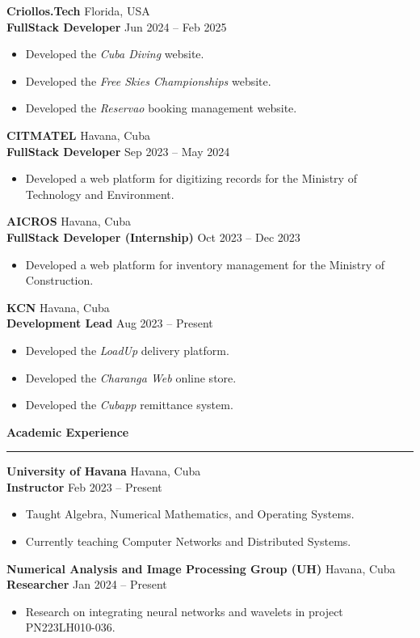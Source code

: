 \documentclass[11pt]{article}
\newcommand{\sectiontitle}[1]{%
	\vspace{30pt}
	{\large \textbf{#1}} \\
	\rule{\linewidth}{0.4pt}
}
\begin{document}
	\vspace{10pt}
	\textbf{Criollos.Tech} \hfill Florida, USA \\
	\textbf{FullStack Developer} \hfill Jun 2024 – Feb 2025
	\begin{itemize}[left=10pt,itemsep=3pt]
		\item Developed the \textit{Cuba Diving} website.
		\item Developed the \textit{Free Skies Championships} website.
		\item Developed the \textit{Reservao} booking management website.
	\end{itemize}
	
	\vspace{10pt}
	\textbf{CITMATEL} \hfill Havana, Cuba \\
	\textbf{FullStack Developer} \hfill Sep 2023 – May 2024
	\begin{itemize}[left=10pt,itemsep=3pt]
		\item Developed a web platform for digitizing records for the Ministry of Technology and Environment.
	\end{itemize}
	
	\vspace{10pt}
	\textbf{AICROS} \hfill Havana, Cuba \\
	\textbf{FullStack Developer (Internship)} \hfill Oct 2023 – Dec 2023
	\begin{itemize}[left=10pt,itemsep=3pt]
		\item Developed a web platform for inventory management for the Ministry of Construction.
	\end{itemize}
	
	\vspace{10pt}
	\textbf{KCN} \hfill Havana, Cuba \\
	\textbf{Development Lead} \hfill Aug 2023 – Present
	\begin{itemize}[left=10pt,itemsep=3pt]
		\item Developed the \textit{LoadUp} delivery platform.
		\item Developed the \textit{Charanga Web} online store.
		\item Developed the \textit{Cubapp} remittance system.
	\end{itemize}
	
	\sectiontitle{Academic Experience}
	\vspace{10pt}
	
	\textbf{University of Havana} \hfill Havana, Cuba \\
	\textbf{Instructor} \hfill Feb 2023 – Present
	\begin{itemize}[left=10pt,itemsep=3pt]
		\item Taught Algebra, Numerical Mathematics, and Operating Systems.
		\item Currently teaching Computer Networks and Distributed Systems.
	\end{itemize}
	
	\vspace{6pt}
	\textbf{Numerical Analysis and Image Processing Group (UH)} \hfill Havana, Cuba \\
	\textbf{Researcher} \hfill Jan 2024 – Present
	\begin{itemize}[left=10pt,itemsep=3pt]
		\item Research on integrating neural networks and wavelets in project PN223LH010-036.
	\end{itemize}
	
\end{document}
